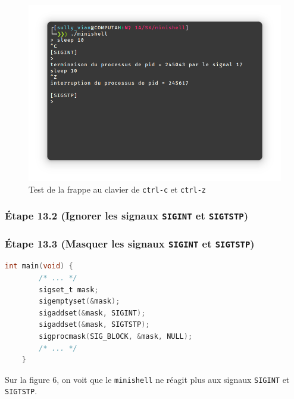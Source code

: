 \documentclass{article}
\begin{document}
\begin{figure}[H]
    \centering
    \includegraphics[width=\textwidth]{./resources/E13.1.png}
    \caption{Test de la frappe au clavier de \texttt{ctrl-c} et \texttt{ctrl-z}}
\end{figure}

\subsubsection*{Étape 13.2 (Ignorer les signaux \texttt{SIGINT} et \texttt{SIGTSTP})}

\subsubsection*{Étape 13.3 (Masquer les signaux \texttt{SIGINT} et \texttt{SIGTSTP})}

\begin{lstlisting}[language=C, caption=ajout de la question 13.3]
    int main(void) {
        /* ... */
        sigset_t mask;
        sigemptyset(&mask);
        sigaddset(&mask, SIGINT);
        sigaddset(&mask, SIGTSTP);
        sigprocmask(SIG_BLOCK, &mask, NULL);
        /* ... */
    }
\end{lstlisting}

Sur la figure 6, on voit que le \texttt{minishell} ne réagit plus aux signaux \texttt{SIGINT} et \texttt{SIGTSTP}.
\end{document}
